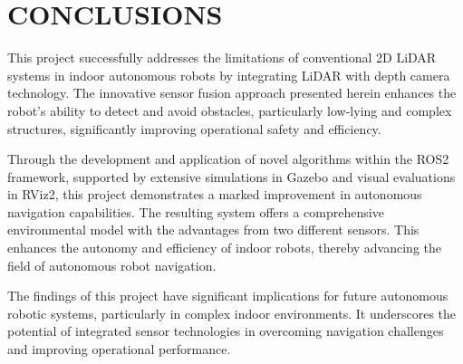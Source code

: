 \section{CONCLUSIONS}
\label{sec:conclusions}
This project successfully addresses the limitations of conventional 2D LiDAR systems in indoor autonomous robots 
by integrating LiDAR with depth camera technology. 
The innovative sensor fusion approach presented herein enhances the robot's ability to detect 
and avoid obstacles, particularly low-lying and complex structures, 
significantly improving operational safety and efficiency.

Through the development and application of novel algorithms within the ROS2 framework, 
supported by extensive simulations in Gazebo and visual evaluations in RViz2, 
this project demonstrates a marked improvement in autonomous navigation capabilities. 
The resulting system offers a comprehensive environmental model with the advantages from two different sensors. 
This enhances the autonomy and efficiency of indoor robots, thereby advancing the field of autonomous robot navigation.

The findings of this project have significant implications for future autonomous robotic systems, 
particularly in complex indoor environments. 
It underscores the potential of integrated sensor technologies in overcoming navigation challenges and improving operational performance.